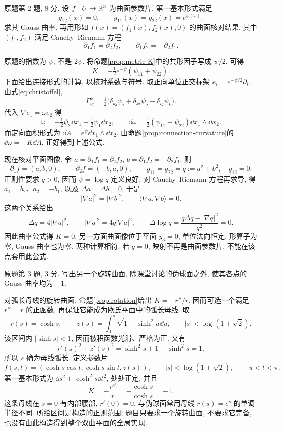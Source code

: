 \begin{exercise}\label{ps:6-2}
原题第 $2$ 题, $8$ 分. 设 $f:U\to\mathbb R^3$ 为曲面参数片, 第一基本形式满足
\[
 g_{12}(x)=0,\qquad g_{11}(x)=g_{22}(x)=e^{\psi(x)}.
\]
求其 Gauss 曲率. 再用形如 $f(x)=(f_1(x),f_2(x),0)$ 的曲面核对结果, 其中 $(f_1,f_2)$ 满足 Cauchy--Riemann 方程
\[
 \partial_1 f_1=\partial_2 f_2,\qquad
 \partial_1 f_2=-\partial_2 f_1.
\]
\end{exercise}
\begin{solution}
原题的指数为 $\psi$, 不是 $2\psi$. 将命题\ref{prop:metric-K}中的共形因子写成 $\psi/2$, 可得
\[
 \boxed{K=-\tfrac12e^{-\psi}(\psi_{11}+\psi_{22}).}
\]
下面给出连接形式的计算, 以核对系数与符号. 取正向单位正交标架 $e_i=e^{-\psi/2}\partial_i$. 由式\eqref{eq:christoffel},
\[
 \Gamma^k_{ij}
 =\tfrac12\bigl(\delta_{kj}\psi_i+\delta_{ki}\psi_j
                 -\delta_{ij}\psi_k\bigr).
\]
代入 $\nabla e_1=\omega e_2$ 得
\[
 \omega=-\tfrac12\psi_2\dd x_1+\tfrac12\psi_1\dd x_2,
 \qquad \dd\omega=\tfrac12(\psi_{11}+\psi_{22})\dd x_1\wedge\dd x_2.
\]
而定向面积形式为 $\dd A=e^\psi\dd x_1\wedge\dd x_2$. 由命题\ref{prop:connection-curvature}的 $\dd\omega=-K\dd A$, 正好得到上述公式.

现在核对平面图像. 令 $a=\partial_1f_1=\partial_2f_2$, $b=\partial_1f_2=-\partial_2f_1$. 则
\[
 \partial_1f=(a,b,0),\qquad \partial_2f=(-b,a,0),
 \qquad g_{11}=g_{22}=q:=a^2+b^2,\quad g_{12}=0.
\]
正则性要求 $q>0$, 因而 $\psi=\log q$ 定义良好. 对 Cauchy--Riemann 方程再求导, 得 $a_1=b_2$、$a_2=-b_1$, 以及 $\Delta a=\Delta b=0$. 于是
\[
 |\nabla a|^2=|\nabla b|^2,\qquad
 \langle\nabla a,\nabla b\rangle=0.
\]
这两个关系给出
\[
 \Delta q=4|\nabla a|^2,\qquad
 |\nabla q|^2=4q|\nabla a|^2,\qquad
 \Delta\log q=\frac{q\Delta q-|\nabla q|^2}{q^2}=0.
\]
因此曲率公式得 $K=0$. 另一方面曲面像位于平面 $y_3=0$, 单位法向恒定, 形算子为零, Gauss 曲率也为零, 两种计算相符. 若 $q=0$, 映射不再是曲面参数片, 不能在该点套用此公式.
\end{solution}

\par{}
\begin{exercise}\label{ps:6-3}
原题第 $3$ 题, $3$ 分. 写出另一个旋转曲面, 除课堂讨论的伪球面之外, 使其各点的 Gauss 曲率均为 $-1$.
\end{exercise}
\begin{solution}
对弧长母线的旋转曲面, 命题\ref{prop:rotation}给出 $K=-r''/r$. 因而可选一个满足 $r''=r$ 的正函数, 再保证它能成为欧氏平面中的弧长母线. 取
\[
 r(s)=\cosh s,\qquad
 z(s)=\int_0^s\sqrt{1-\sinh^2 u}\dd u,
 \qquad |s|<\log(1+\sqrt2).
\]
该区间内 $|\sinh s|<1$, 因而被积函数光滑、严格为正. 又有
\[
 r'(s)^2+z'(s)^2=\sinh^2s+1-\sinh^2s=1.
\]
所以 $s$ 确为母线弧长. 定义参数片
\[
 f(s,t)=(\cosh s\cos t,\cosh s\sin t,z(s)),
 \qquad |s|<\log(1+\sqrt2),\quad -\pi<t<\pi.
\]
第一基本形式为 $\dd s^2+\cosh^2s\dd t^2$, 处处正定, 并且
\[
 K=-\frac{r''}{r}=-\frac{\cosh s}{\cosh s}=-1.
\]
这条母线在 $s=0$ 有内部腰部, $r'(0)=0$, 与伪球面常用母线 $r(s)=e^s$ 的单调半径不同. 所给区间是构造的正则范围; 题目只要求一个旋转曲面, 不要求它完备, 也没有由此构造得到整个双曲平面的全局实现.
\end{solution}

